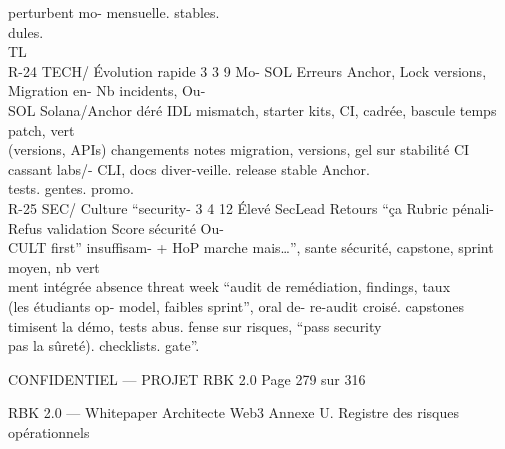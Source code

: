 perturbent  mo-                                             mensuelle.        stables.\\
dules.\\
TL\\
R-24   TECH/     Évolution rapide 3 3 9      Mo- SOL        Erreurs Anchor, Lock     versions, Migration    en- Nb incidents, Ou-\\
SOL       Solana/Anchor               déré           IDL    mismatch, starter kits, CI, cadrée, bascule temps patch, vert\\
(versions, APIs)                           changements      notes migration, versions, gel sur stabilité CI\\
cassant    labs/-                          CLI, docs diver-veille.            release   stable Anchor.\\
tests.                                     gentes.                            promo.\\
R-25   SEC/      Culture “security- 3 4 12 Élevé SecLead Retours         “ça Rubric      pénali- Refus validation Score sécurité Ou-\\
CULT      first” insuffisam-              + HoP marche mais…”, sante           sécurité, capstone, sprint moyen,      nb vert\\
ment      intégrée                      absence threat week             “audit de remédiation, findings, taux\\
(les étudiants op-                      model,      faibles sprint”, oral de- re-audit croisé. capstones\\
timisent la démo,                       tests abus.         fense sur risques,                  “pass security\\
pas la sûreté).                                             checklists.                          gate”.\\
\vspace{0.5em}
\vspace{0.5em}
\vspace{0.5em}
\vspace{0.5em}
\begin{confidential}CONFIDENTIEL — PROJET RBK 2.0                                                                                           Page 279 sur 316\end{confidential}
RBK 2.0 — Whitepaper Architecte Web3                                                                            Annexe U. Registre des risques opérationnels\\
\vspace{0.5em}
